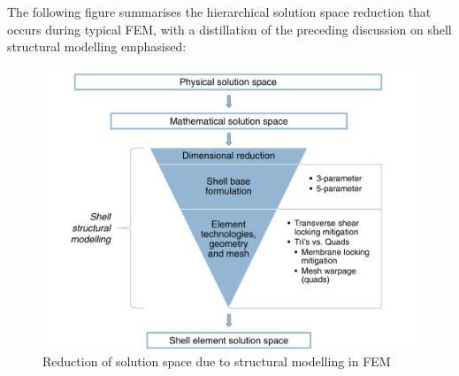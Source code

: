 The following figure summarises the hierarchical solution space reduction that occurs during typical FEM, with a distillation of the preceding discussion on shell structural modelling emphasised:

\begin{figure}[H]
	\centering
	\def\svgwidth{\columnwidth}
	\includegraphics[width=12cm]{images/MODELLING_1.pdf}
	\caption{Reduction of solution space due to structural modelling in FEM}
	\label{pic:applications10}
\end{figure}
